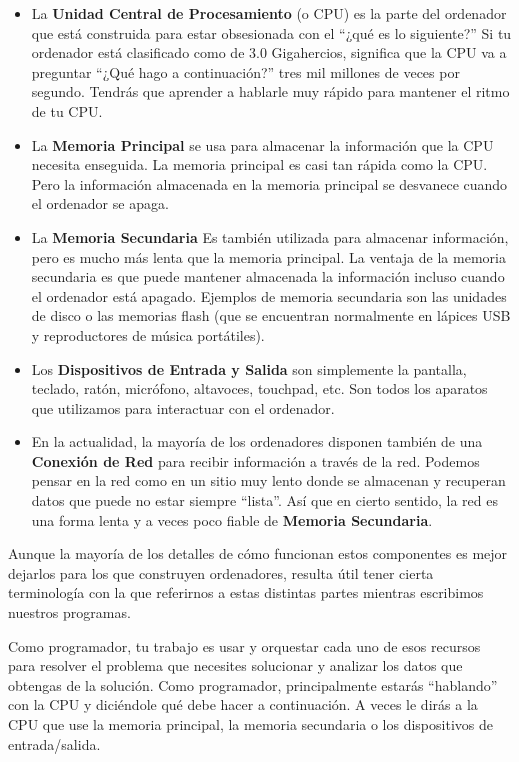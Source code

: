 \begin{itemize}

\item La {\bf Unidad Central de Procesamiento} (o CPU) es
la parte del ordenador que está construida para estar obsesionada
con el ``¿qué es lo siguiente?'' Si tu ordenador está clasificado
como de 3.0 Gigahercios, significa que la CPU va a preguntar ``¿Qué hago a continuación?''
tres mil millones de veces por segundo. Tendrás que aprender a hablarle muy
rápido para mantener el ritmo de tu CPU.

\item La {\bf Memoria Principal} se usa para almacenar la información
que la CPU necesita enseguida. La memoria principal es casi
tan rápida como la CPU. Pero la información almacenada en la memoria
principal se desvanece cuando el ordenador se apaga.

\item La {\bf Memoria Secundaria} Es también utilizada para almacenar
información, pero es mucho más lenta que la memoria principal.
La ventaja de la memoria secundaria es que puede mantener
almacenada la información incluso cuando el ordenador está apagado.
Ejemplos de memoria secundaria son las unidades de disco o las
memorias flash (que se encuentran normalmente en lápices USB y
reproductores de música portátiles).

\item Los {\bf Dispositivos de Entrada y Salida} son simplemente
la pantalla, teclado, ratón, micrófono, altavoces, touchpad, etc.
Son todos los aparatos que utilizamos para interactuar con el ordenador.

\item En la actualidad, la mayoría de los ordenadores disponen también de una
{\bf Conexión de Red} para recibir información a través de la red.
Podemos pensar en la red como en un sitio muy lento donde se almacenan
y recuperan datos que puede no estar siempre ``lista''. Así que en cierto sentido,
la red es una forma lenta y a veces poco fiable de
{\bf Memoria Secundaria}.

\end{itemize}

Aunque la mayoría de los detalles de cómo funcionan estos componentes es mejor
dejarlos para los que construyen ordenadores, resulta útil tener cierta terminología
con la que referirnos a estas distintas partes mientras escribimos nuestros programas.

Como programador, tu trabajo es usar y orquestar cada uno de esos
recursos para resolver el problema que necesites solucionar
y analizar los datos que obtengas de la solución. Como programador, principalmente
estarás ``hablando'' con la CPU y diciéndole qué debe hacer a continuación.
A veces le dirás a la CPU que use la memoria principal,
la memoria secundaria o los dispositivos de entrada/salida.

